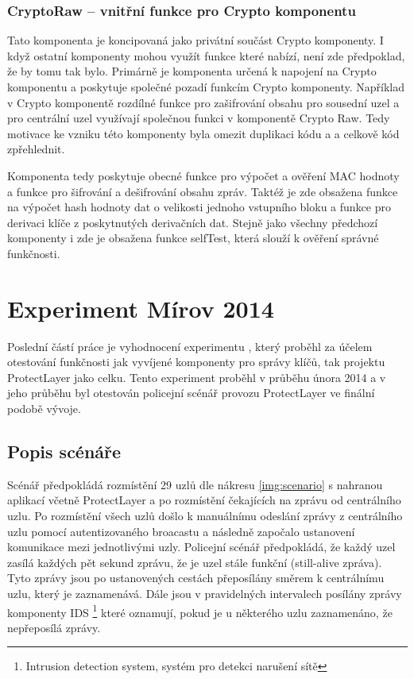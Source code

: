 \documentclass[11pt,final,twoside]{fithesis2}
\begin{document}
\subsection{CryptoRaw -- vnitřní funkce pro Crypto komponentu} \label{sub:rawcrypto}

Tato komponenta je koncipovaná jako privátní součást Crypto komponenty. I když ostatní komponenty mohou využít funkce které 
nabízí, není zde předpoklad, že by tomu tak bylo. Primárně je komponenta určená k napojení na Crypto komponentu a poskytuje 
společné pozadí funkcím Crypto komponenty. Například v Crypto komponentě rozdílné funkce pro zašifrování obsahu pro sousední uzel a pro 
centrální uzel využívají společnou funkci v komponentě Crypto Raw. Tedy motivace ke vzniku této komponenty byla omezit duplikaci kódu a 
a celkově kód zpřehlednit. 

Komponenta tedy poskytuje obecné funkce pro výpočet a ověření MAC hodnoty a funkce pro šifrování a dešifrování obsahu zpráv. 
Taktéž je zde obsažena funkce na výpočet hash hodnoty dat o velikosti jednoho vstupního bloku a funkce pro derivaci klíče z 
poskytnutých derivačních dat. Stejně jako všechny předchozí komponenty i zde je obsažena funkce selfTest, která slouží k ověření
správné funkčnosti. 

\chapter{Experiment Mírov 2014}
Poslední částí práce je vyhodnocení experimentu \cite{Svenda2014}, který proběhl za účelem otestování funkčnosti jak vyvíjené komponenty 
pro správy klíčů, tak projektu ProtectLayer jako celku. Tento experiment proběhl v průběhu února 2014 a v jeho průběhu byl otestován
policejní scénář provozu ProtectLayer ve finální podobě vývoje. 

\section{Popis scénáře}
Scénář předpokládá rozmístění 29 uzlů dle nákresu \ref{img:scenario} s nahranou aplikací včetně ProtectLayer a po rozmístění čekajících 
na zprávu od centrálního uzlu. Po rozmístění všech uzlů došlo k manuálnímu odeslání zprávy z centrálního uzlu pomocí autentizovaného 
broacastu a následně započalo ustanovení komunikace mezi jednotlivými uzly. Policejní scénář předpokládá, že každý uzel zasílá každých 
pět sekund zprávu, že je uzel stále funkční (still-alive zpráva). Tyto zprávy jsou po ustanovených cestách přeposílány směrem k 
centrálnímu uzlu, který je zaznamenává. Dále jsou v pravidelných intervalech posílány zprávy komponenty IDS \footnote{Intrusion detection 
system, systém pro detekci narušení sítě} které oznamují, pokud je u některého uzlu zaznamenáno, že nepřeposílá zprávy. 
\end{document}
